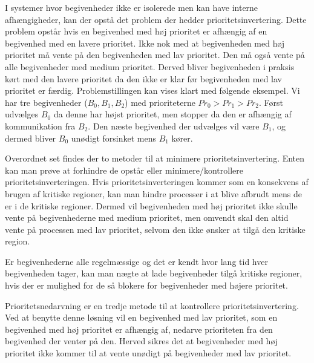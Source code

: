 I systemer hvor begivenheder ikke er isolerede men kan have interne afhængigheder, kan der opstå det problem der hedder prioritetsinvertering\cite{sha1990priority}. Dette problem opstår hvis en begivenhed med høj prioritet er afhængig af en begivenhed med en lavere prioritet. Ikke nok med at begivenheden med høj prioritet må vente på den  begivenheden med lav prioritet. Den må også vente på alle begivenheder med medium prioritet. Derved bliver begivenheden i praksis kørt med den lavere prioritet da den ikke er klar før begivenheden med lav prioritet er færdig. Problemstillingen kan vises klart med følgende eksempel. Vi har tre begivenheder ($B_0,B_1,B_2$) med prioriteterne $Pr_0>Pr_1>Pr_2$. Først udvælges $B_0$ da denne har højst prioritet, men stopper da den er afhængig af kommunikation fra $B_2$. Den næste begivenhed der udvælges vil være $B_1$, og dermed bliver $B_0$ unødigt forsinket mens $B_1$ kører.

Overordnet set findes der to metoder til at minimere prioritetsinvertering. Enten kan man prøve at forhindre de opstår eller minimere/kontrollere prioritetsinverteringen. 
Hvis prioritetsinverteringen kommer som en konsekvens af brugen af kritiske regioner, kan man hindre processer i at blive afbrudt mens de er i de kritiske regioner. Dermed vil begivenheden med høj prioritet ikke skulle vente på begivenhederne med medium prioritet, men omvendt skal den altid vente på processen med lav prioritet, selvom den ikke ønsker at tilgå den kritiske region. 

Er begivenhederne alle regelmæssige og det er kendt hvor lang tid hver begivenheden tager, kan man nægte at lade begivenheder tilgå kritiske regioner, hvis der er mulighed for de så blokere for begivenheder med højere prioritet.

Prioritetsnedarvning er en tredje metode til at kontrollere prioritetsinvertering\cite{sha1990priority}. Ved at benytte denne løsning vil en begivenhed med lav prioritet, som en begivenhed med høj prioritet er afhængig af, nedarve prioriteten fra den begivenhed der venter på den. Herved sikres det at begivenheder med høj prioritet ikke kommer til at vente unødigt på begivenheder med lav prioritet. 


